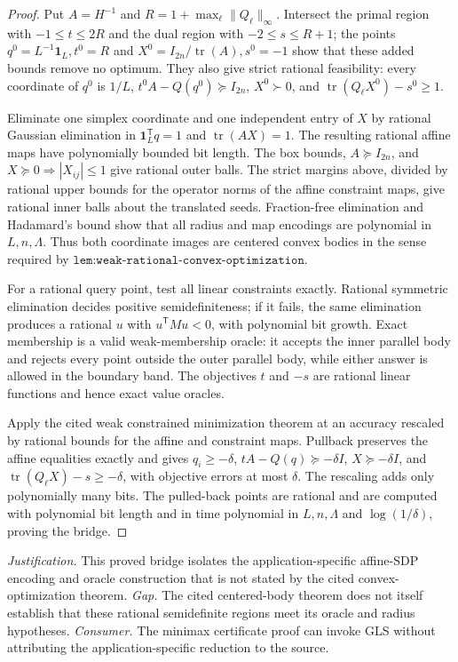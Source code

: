 \documentclass{article}
\begin{document}
\begin{proof}
Put \(A=H^{-1}\) and \(R=1+\max_\ell\|Q_\ell\|_\infty\). Intersect the primal region with \(-1\le t\le2R\) and the dual region with \(-2\le s\le R+1\); the points \(q^0=L^{-1}\mathbf1_L,t^0=R\) and \(X^0=I_{2n}/\operatorname{tr}(A),s^0=-1\) show that these added bounds remove no optimum. They also give strict rational feasibility: every coordinate of \(q^0\) is \(1/L\), \(t^0A-Q(q^0)\succeq I_{2n}\), \(X^0\succ0\), and \(\operatorname{tr}(Q_\ell X^0)-s^0\ge1\).

Eliminate one simplex coordinate and one independent entry of \(X\) by rational Gaussian elimination in \(\mathbf1_L^{\mathsf T}q=1\) and \(\operatorname{tr}(AX)=1\). The resulting rational affine maps have polynomially bounded bit length. The box bounds, \(A\succeq I_{2n}\), and \(X\succeq0\Rightarrow |X_{ij}|\le1\) give rational outer balls. The strict margins above, divided by rational upper bounds for the operator norms of the affine constraint maps, give rational inner balls about the translated seeds. Fraction-free elimination and Hadamard's bound show that all radius and map encodings are polynomial in \(L,n,\Lambda\). Thus both coordinate images are centered convex bodies in the sense required by \(\texttt{lem:weak-rational-convex-optimization}\).

For a rational query point, test all linear constraints exactly. Rational symmetric elimination decides positive semidefiniteness; if it fails, the same elimination produces a rational \(u\) with \(u^{\mathsf T}Mu<0\), with polynomial bit growth. Exact membership is a valid weak-membership oracle: it accepts the inner parallel body and rejects every point outside the outer parallel body, while either answer is allowed in the boundary band. The objectives \(t\) and \(-s\) are rational linear functions and hence exact value oracles.

Apply the cited weak constrained minimization theorem at an accuracy rescaled by rational bounds for the affine and constraint maps. Pullback preserves the affine equalities exactly and gives \(q_i\ge-\delta\), \(tA-Q(q)\succeq-\delta I\), \(X\succeq-\delta I\), and \(\operatorname{tr}(Q_\ell X)-s\ge-\delta\), with objective errors at most \(\delta\). The rescaling adds only polynomially many bits. The pulled-back points are rational and are computed with polynomial bit length and in time polynomial in \(L,n,\Lambda\) and \(\log(1/\delta)\), proving the bridge.
\end{proof}
\par\smallskip\noindent \textit{Justification.} This proved bridge isolates the application-specific affine-SDP encoding and oracle construction that is not stated by the cited convex-optimization theorem. \textit{Gap.} The cited centered-body theorem does not itself establish that these rational semidefinite regions meet its oracle and radius hypotheses. \textit{Consumer.} The minimax certificate proof can invoke GLS without attributing the application-specific reduction to the source.
\end{document}
